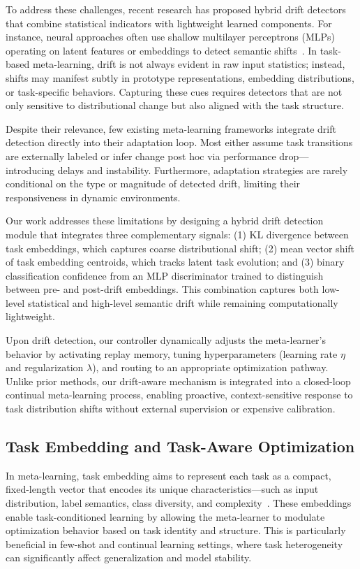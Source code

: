 \documentclass[conference]{IEEEtran}
\begin{document}
To address these challenges, recent research has proposed hybrid drift detectors that combine statistical indicators with lightweight learned components. For instance, neural approaches often use shallow multilayer perceptrons (MLPs) operating on latent features or embeddings to detect semantic shifts~\cite{lu2018learning, elwell2011incremental}. In task-based meta-learning, drift is not always evident in raw input statistics; instead, shifts may manifest subtly in prototype representations, embedding distributions, or task-specific behaviors. Capturing these cues requires detectors that are not only sensitive to distributional change but also aligned with the task structure.

Despite their relevance, few existing meta-learning frameworks integrate drift detection directly into their adaptation loop. Most either assume task transitions are externally labeled or infer change post hoc via performance drop—introducing delays and instability. Furthermore, adaptation strategies are rarely conditional on the type or magnitude of detected drift, limiting their responsiveness in dynamic environments.

Our work addresses these limitations by designing a hybrid drift detection module that integrates three complementary signals: (1) KL divergence between task embeddings, which captures coarse distributional shift; (2) mean vector shift of task embedding centroids, which tracks latent task evolution; and (3) binary classification confidence from an MLP discriminator trained to distinguish between pre- and post-drift embeddings. This combination captures both low-level statistical and high-level semantic drift while remaining computationally lightweight.

Upon drift detection, our controller dynamically adjusts the meta-learner’s behavior by activating replay memory, tuning hyperparameters (learning rate $\eta$ and regularization $\lambda$), and routing to an appropriate optimization pathway. Unlike prior methods, our drift-aware mechanism is integrated into a closed-loop continual meta-learning process, enabling proactive, context-sensitive response to task distribution shifts without external supervision or expensive calibration.


\subsection{Task Embedding and Task-Aware Optimization}

In meta-learning, task embedding aims to represent each task as a compact, fixed-length vector that encodes its unique characteristics—such as input distribution, label semantics, class diversity, and complexity~\cite{rusu2019meta}. These embeddings enable task-conditioned learning by allowing the meta-learner to modulate optimization behavior based on task identity and structure. This is particularly beneficial in few-shot and continual learning settings, where task heterogeneity can significantly affect generalization and model stability.
\end{document}
